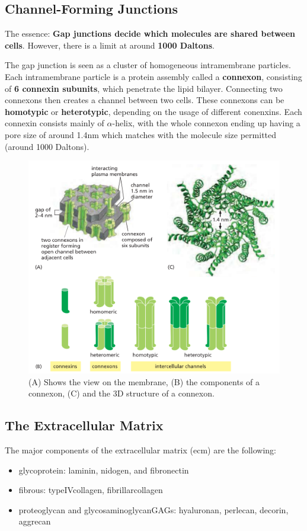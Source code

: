 \documentclass[../main.tex]{subfiles}
\begin{document}
\subsection{Channel-Forming Junctions}

The essence: \textbf{Gap junctions decide which molecules are shared between cells}. However, there is a limit at around \textbf{1000 Daltons}.

The gap junction is seen as a cluster of homogeneous intramembrane particles. Each intramembrane particle is a protein assembly called a \textbf{\gls{connexon}}, consisting of \textbf{6 \gls{connexin} subunits}, which penetrate the lipid bilayer. Connecting two connexons then creates a channel between two cells. These connexons can be \textbf{\gls{homotypic}} or \textbf{\gls{heterotypic}}, depending on the usage of different conenxins. Each connexin consists mainly of $\alpha$-helix, with the whole connexon ending up having a pore size of around 1.4nm which matches with the molecule size permitted (around 1000 Daltons).

\begin{figure}[H]
	\centering
	\includegraphics[width=0.8\linewidth]{gap_over}
	\caption{(A) Shows the view on the membrane, (B) the components of a connexon, (C) and the 3D structure of a connexon.}
	\label{fig:gapover}
\end{figure}


\subsection{The Extracellular Matrix}

The major components of the extracellular matrix (ecm) are the following:
\begin{itemize}
	\item \gls{glycoprotein}: \gls{laminin}, \gls{nidogen}, and \gls{fibronectin}
	\item \gls{fibrous}: \gls{typeIVcollagen}, \gls{fibrillarcollagen}
	\item \gls{proteoglycan} and \gls{glycosaminoglycanGAGs}: \gls{hyaluronan}, \gls{perlecan}, \gls{decorin}, \gls{aggrecan}
\end{itemize} 
\end{document}
